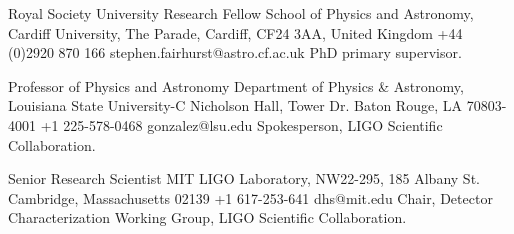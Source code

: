 
            {Royal Society University Research Fellow}
            {School of Physics and Astronomy, Cardiff University, The Parade, Cardiff,\newline
            CF24 3AA, United Kingdom}
            {+44 (0)2920 870 166}
            {stephen.fairhurst@astro.cf.ac.uk}
            {PhD primary supervisor.}



            {Professor of Physics and Astronomy}
            {Department of Physics \& Astronomy, Louisiana State University-C Nicholson Hall, Tower Dr.\newline
             Baton Rouge, LA 70803-4001}
            {+1 225-578-0468}
            {gonzalez@lsu.edu}
            {Spokesperson, LIGO Scientific Collaboration.}

            {Senior Research Scientist}
            {MIT LIGO Laboratory, NW22-295, 185 Albany St.\newline
             Cambridge, Massachusetts 02139}
            {+1 617-253-641}
            {dhs@mit.edu}
            {Chair, Detector Characterization Working Group, LIGO Scientific Collaboration.}
